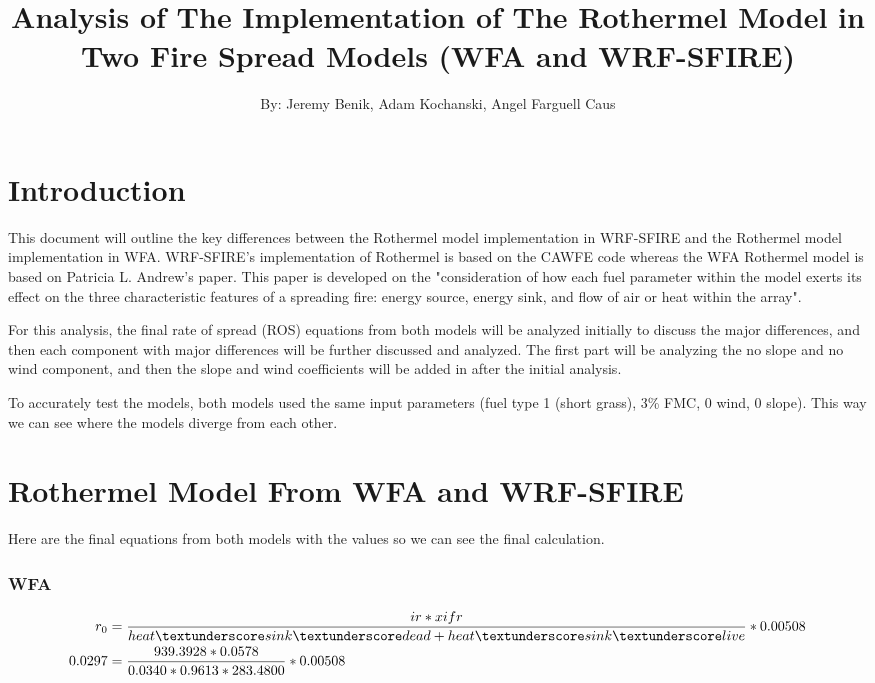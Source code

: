\documentclass{article}
\newcommand\und{\textunderscore}
\begin{document}
\title{Analysis of The Implementation of The Rothermel Model in Two Fire Spread Models (WFA and WRF-SFIRE)}
\author{By: Jeremy Benik, Adam Kochanski, Angel Farguell Caus}
\maketitle


\section{Introduction}
	This document will outline the key differences between the Rothermel model implementation in WRF-SFIRE and the Rothermel model implementation in WFA. WRF-SFIRE's implementation of Rothermel is based on the CAWFE code whereas the WFA Rothermel model is based on Patricia L. Andrew's paper. This paper is developed on the "consideration of how each fuel parameter within the model exerts its effect on the three characteristic features of a spreading fire: energy source, energy sink, and flow of air or heat within the array"\citep{Andrews2018}. 
	
	For this analysis, the final rate of spread (ROS) equations from both models will be analyzed initially to discuss the major differences, and then each component with major differences will be further discussed and analyzed. The first part will be analyzing the no slope and no wind component, and then the slope and wind coefficients will be added in after the initial analysis. 
	
	To accurately test the models, both models used the same input parameters (fuel type 1 (short grass), 3\% FMC, 0 wind, 0 slope). This way we can see where the models diverge from each other. 
	
\section{Rothermel Model From WFA and WRF-SFIRE}

Here are the final equations from both models with the values so we can see the final calculation. 

\subsubsection*{WFA}
	\begin{equation}
	\label{r0_WFA_2}
	\begin{split}
	r_0 &= \frac{ir * xifr}{heat\und sink\und dead + heat\und sink\und live} * 0.00508 \\
	0.0297 &= \frac{939.3928 * 0.0578}{0.0340 * 0.9613 * 283.4800} * 0.00508
	\end{split}
\end{equation}
\end{document}
